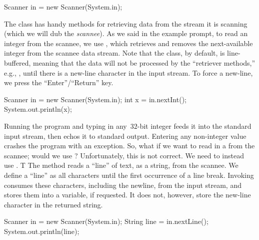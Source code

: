 \begin{verbnobox}[\small]
Scanner in = new Scanner(System.in);
\end{verbnobox}

The  class has handy methods for retrieving data from the stream it is scanning (which we will dub the \emph{scannee}). 
As we said in the example prompt, to read an integer from the scannee, we use , which retrieves and removes the next-available integer from the scannee data stream. 
Note that the  class, by default, is line-buffered, meaning that the data will not be processed by the ``retriever methods,'' e.g., , until there is a new-line character in the input stream. To force a new-line, we press the ``Enter''/``Return'' key.

\begin{verbnobox}[\small]
Scanner in = new Scanner(System.in);
int x = in.nextInt();
System.out.println(x);
\end{verbnobox}

Running the program and typing in any~$32$-bit integer feeds it into the standard input stream, then echos it to standard output. 
Entering any non-integer value crashes the program with an  exception. 
So, what if we want to read in a  from the scannee; would we use ? 
Unfortunately, this is not correct. 
We need to instead use . T
The  method reads a ``line'' of text, as a string, from the scannee. 
We define a ``line'' as all characters until the first occurrence of a line break. 
Invoking  consumes these characters, including the newline, from the input stream, and stores them into a variable, if requested. 
It does not, however, store the new-line character in the returned string. 

\begin{verbnobox}[\small]
Scanner in = new Scanner(System.in);
String line = in.nextLine();
System.out.println(line);
\end{verbnobox}

